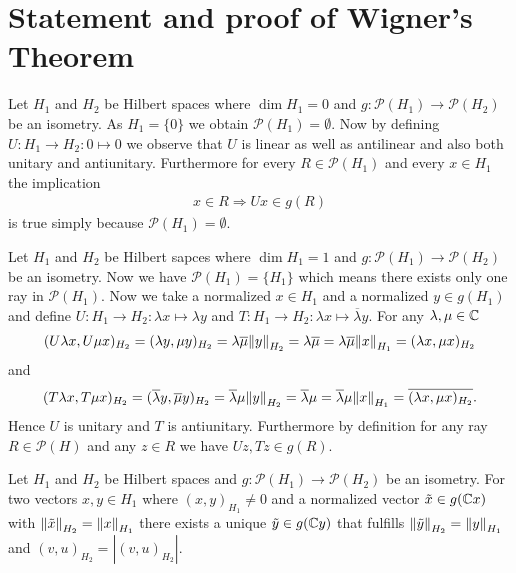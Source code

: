 \section{Statement and proof of Wigner's Theorem}

\begin{example} \label{example:zerodim}
	Let $H_1$ and $H_2$ be Hilbert spaces where $\dim H_1 = 0$ and $g: \mathcal{P}(H_1) \to \mathcal{P}(H_2)$ be an isometry. As $H_1 = \{0\}$ we obtain $\mathcal{P}(H_1) = \emptyset$. Now by defining $U: H_1 \to H_2: 0 \mapsto 0$ we observe that $U$ is linear as well as antilinear and also both unitary and antiunitary. Furthermore for every $R \in \mathcal{P}(H_1)$ and every $x \in H_1$ the implication 
	\begin{align*}
		x \in R \Rightarrow Ux \in g(R)
	\end{align*} 
	is true simply because $\mathcal{P}(H_1) = \emptyset$.
\end{example}

\begin{example} \label{example:onedim}
	Let $H_1$ and $H_2$ be Hilbert sapces where $\dim H_1 = 1$ and $g: \mathcal{P}(H_1) \to \mathcal{P}(H_2)$ be an isometry. Now we have $\mathcal{P}(H_1) = \{H_1\}$ which means there exists only one ray in $\mathcal{P}(H_1)$. Now we take a normalized $x \in H_1$ and a normalized $y \in g(H_1)$ and define $U: H_1 \to H_2: \lambda x \mapsto \lambda y$ and $T: H_1 \to H_2: \lambda x \mapsto \overline{\lambda} y$. For any $\lambda, \mu \in \C$
	\begin{align*}
		(U \lambda x, U \mu x)_{H_2} = (\lambda y, \mu y)_{H_2} = \lambda \overline{\mu} \norm[H_2]{y} = \lambda \overline{\mu} = \lambda \overline{\mu} \norm[H_1]{x} = (\lambda x, \mu x)_{H_2}
	\end{align*}
	and 
	\begin{align*}
		(T\lambda x, T \mu x)_{H_2} = (\overline{\lambda} y, \overline{\mu} y)_{H_2} = \overline{\lambda} \mu \norm[H_2]{y} = \overline{\lambda} \mu = \overline{\lambda } \mu \norm[H_1]{x} = \overline{(\lambda x, \mu x)_{H_2}}.
	\end{align*}
	Hence $U$ is unitary and $T$ is antiunitary. Furthermore by definition for any ray $R \in \mathcal{P}(H)$ and any $z \in R$ we have $Uz, Tz \in g(R)$. 
\end{example}

\begin{lemma} \label{lemma:phase_adjustment_ray}
	Let $H_1$ and $H_2$ be Hilbert spaces and $g: \mathcal{P}(H_1) \to \mathcal{P}(H_2)$ be an isometry. For two vectors $x,y \in H_1$ where $(x,y)_{H_1} \neq 0$ and a normalized vector $\tilde{x} \in g(\C x)$ with $\norm[H_2]{\tilde{x}} = \norm[H_1]{x}$ there exists a unique $\tilde{y} \in g(\C y)$ that fulfills $\norm[H_2]{\tilde{y}} = \norm[H_1]{y}$ and $(v,u)_{H_2} = |(v,u)_{H_2}| $.
\end{lemma}

